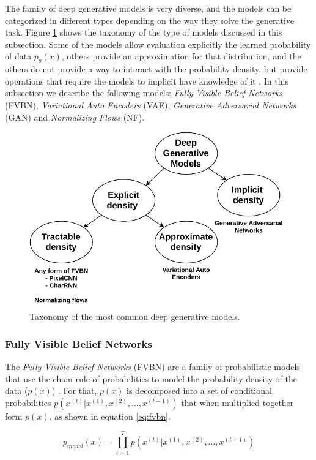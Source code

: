 The family of deep generative models is very diverse, and the models can be categorized in different types depending on the way they solve the generative task. Figure \ref{fig:generativetaxonomy} shows the taxonomy of the type of models discussed in this subsection. Some of the models allow evaluation explicitly the learned probability of data $p_\theta(x)$, others provide an approximation for that distribution, and the others do not provide a way to interact with the probability density, but provide operations that require the models to implicit have knowledge of it \cite{Goodfellow2016}. In this subsection we describe the following models:\textit{ Fully Visible Belief Networks} (FVBN), \textit{Variational Auto Encoders} (VAE), \textit{Generative Adversarial Networks} (GAN) and \textit{Normalizing Flows} (NF).

\begin{figure}
	\centering
	\includegraphics[width=0.7\linewidth]{chapter2/images/generativetaxonomy}
	\caption{Taxonomy of the most common deep generative models.}
	\label{fig:generativetaxonomy}
\end{figure}


\subsubsection{Fully Visible Belief Networks}
The \textit{Fully Visible Belief Networks} (FVBN) are a family of probabilistic models that use the chain rule of probabilities to model the probability density of the data ($p(x)$) \cite{smith2018}. For that, $p(x)$ is decomposed into a set of conditional probabilities $p(x^(t)| x^(1), x^(2), ..., x^(t-1))$ that when multiplied together form  $p(x)$, as shown in equation \ref{eq:fvbn}.

\begin{equation}
	\label{eq:fvbn}
	p_{model}(x) = \prod_{i=1}^{T} p(x^{(t)}| x^{(1)}, x^{(2)}, ..., x^{(t-1)})
\end{equation}

